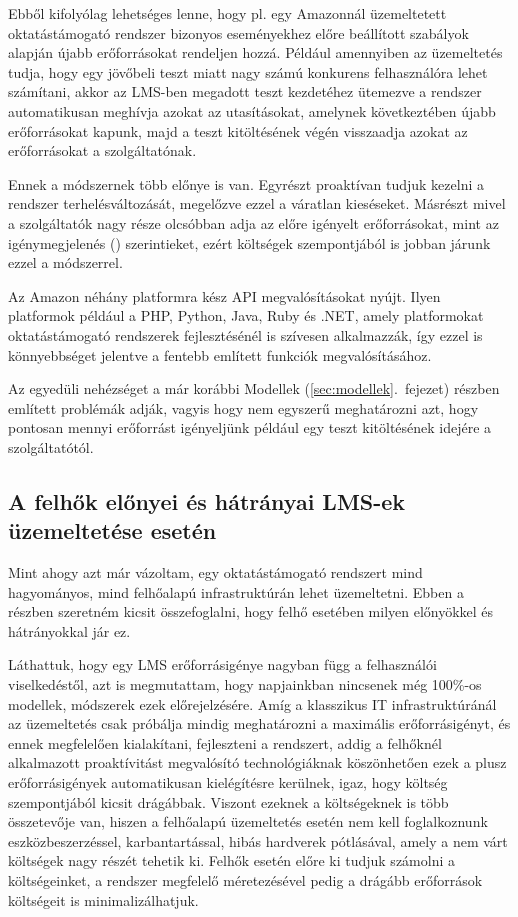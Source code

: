 Ebből kifolyólag lehetséges lenne, hogy pl. egy Amazonnál üzemeltetett oktatástámogató rendszer bizonyos eseményekhez előre beállított szabályok alapján újabb erőforrásokat rendeljen hozzá. Például amennyiben az üzemeltetés tudja, hogy egy jövőbeli teszt miatt nagy számú konkurens felhasználóra lehet számítani, akkor az LMS-ben megadott teszt kezdetéhez ütemezve a rendszer automatikusan meghívja azokat az utasításokat, amelynek következtében újabb erőforrásokat kapunk, majd a teszt kitöltésének végén visszaadja azokat az erőforrásokat a szolgáltatónak.

Ennek a módszernek több előnye is van. Egyrészt proaktívan tudjuk kezelni a rendszer terhelésváltozását, megelőzve ezzel a váratlan kieséseket. Másrészt mivel a szolgáltatók nagy része olcsóbban adja az előre igényelt erőforrásokat, mint az igénymegjelenés () szerintieket, ezért költségek szempontjából is jobban járunk ezzel a módszerrel.

Az Amazon néhány platformra kész API megvalósításokat nyújt. Ilyen platformok például a PHP, Python, Java, Ruby és .NET, amely platformokat oktatástámogató rendszerek fejlesztésénél is szívesen alkalmazzák, így ezzel is könnyebbséget jelentve a fentebb említett funkciók megvalósításához.

Az egyedüli nehézséget a már korábbi Modellek (\ref{sec:modellek}.~fejezet) részben említett problémák adják, vagyis hogy nem egyszerű meghatározni azt, hogy pontosan mennyi erőforrást igényeljünk például egy teszt kitöltésének idejére a szolgáltatótól. 

\subsection{A felhők előnyei és hátrányai LMS-ek üzemeltetése esetén}


Mint ahogy azt már vázoltam, egy oktatástámogató rendszert mind hagyományos, mind felhőalapú infrastruktúrán lehet üzemeltetni. Ebben a részben szeretném kicsit összefoglalni, hogy felhő esetében milyen előnyökkel és hátrányokkal jár ez.

Láthattuk, hogy egy LMS erőforrásigénye nagyban függ a felhasználói viselkedéstől, azt is megmutattam, hogy napjainkban nincsenek még 100\%-os modellek, módszerek ezek előrejelzésére. Amíg a klasszikus IT infrastruktúránál az üzemeltetés csak próbálja mindig meghatározni a maximális erőforrásigényt, és ennek megfelelően kialakítani, fejleszteni a rendszert, addig a felhőknél alkalmazott proaktívitást megvalósító technológiáknak köszönhetően ezek a plusz erőforrásigények automatikusan kielégítésre kerülnek, igaz, hogy költség szempontjából kicsit drágábbak. Viszont ezeknek a költségeknek is több összetevője van, hiszen a felhőalapú üzemeltetés esetén nem kell foglalkoznunk eszközbeszerzéssel, karbantartással, hibás hardverek pótlásával, amely a nem várt költségek nagy részét tehetik ki. Felhők esetén előre ki tudjuk számolni a költségeinket, a rendszer megfelelő méretezésével pedig a drágább  erőforrások költségeit is minimalizálhatjuk.

